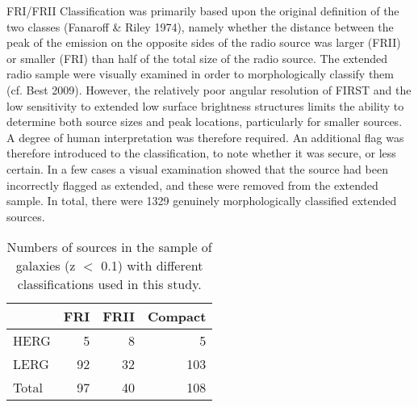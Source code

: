 \documentclass[usenatbib]{mn2e}
\begin{document}
FRI/FRII Classification was
primarily based upon the original definition of the two classes (Fanaroff
\& Riley 1974), namely whether the distance between the peak of the
emission on the opposite sides of the radio source was larger (FRII) or
smaller (FRI) than half of the total size of the radio source. 
The extended radio sample were visually examined in order to
morphologically classify them (cf. Best 2009). However,
the relatively poor angular resolution of FIRST and the low sensitivity to
extended low surface brightness structures limits the ability to determine
both source sizes and peak locations, particularly for smaller sources. A
degree of human interpretation was therefore required. An additional flag
was therefore introduced to the classification, to note whether it was
secure, or less certain. In a few cases a visual
examination showed that the source had been incorrectly flagged as
extended, and these were removed from the extended sample. In total, there were
1329 genuinely morphologically classified extended sources. 





\begin{table}
\center
\begin{tabular}{lrrr}
\hline
 & FRI & FRII & Compact      \\
\hline
HERG &5 & 8 & 5    \\
LERG &92 & 32 &  103   \\
Total &97 & 40 &  108   \\
\hline  
\end{tabular}
\caption{Numbers of sources in the sample of galaxies (z $<$ 0.1) with different classifications used in this study.  
\label{table5}
}
\end{table}
\end{document}
